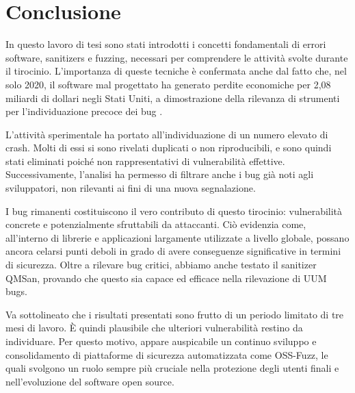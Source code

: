 \chapter{Conclusione}

In questo lavoro di tesi sono stati introdotti i concetti fondamentali di errori software, sanitizers e fuzzing, necessari per comprendere le attività svolte durante il tirocinio. L’importanza di queste tecniche è confermata anche dal fatto che, nel solo 2020, il software mal progettato ha generato perdite economiche per 2,08 miliardi di dollari negli Stati Uniti, a dimostrazione della rilevanza di strumenti per l’individuazione precoce dei bug \cite{ref32}.

L’attività sperimentale ha portato all’individuazione di un numero elevato di crash. Molti di essi si sono rivelati duplicati o non riproducibili, e sono quindi stati eliminati poiché non rappresentativi di vulnerabilità effettive. Successivamente, l’analisi ha permesso di filtrare anche i bug già noti agli sviluppatori, non rilevanti ai fini di una nuova segnalazione.

I bug rimanenti costituiscono il vero contributo di questo tirocinio: vulnerabilità concrete e potenzialmente sfruttabili da attaccanti. Ciò evidenzia come, all’interno di librerie e applicazioni largamente utilizzate a livello globale, possano ancora celarsi punti deboli in grado di avere conseguenze significative in termini di sicurezza.
Oltre a rilevare bug critici, abbiamo anche testato il sanitizer QMSan, provando che questo sia capace ed efficace nella rilevazione di UUM bugs. 

Va sottolineato che i risultati presentati sono frutto di un periodo limitato di tre mesi di lavoro. È quindi plausibile che ulteriori vulnerabilità restino da individuare. Per questo motivo, appare auspicabile un continuo sviluppo e consolidamento di piattaforme di sicurezza automatizzata come OSS-Fuzz, le quali svolgono un ruolo sempre più cruciale nella protezione degli utenti finali e nell’evoluzione del software open source.
